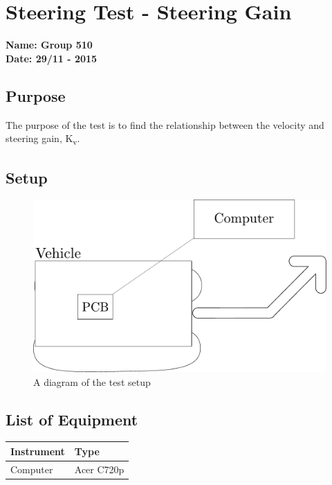 \pagebreak
\section{Steering Test - Steering Gain} \label{app:steeringOrderTest}
\textbf{Name: Group 510}\\
\textbf{Date: 29/11 - 2015}

\subsection{Purpose}
The purpose of the test is to find the relationship between the velocity and steering gain, \si{K_v}.


\subsection{Setup}
\begin{figure}[H]
  \centering
	\includegraphics[scale=0.7]{figures/inertiaTestSetupDiagramTurning.pdf}
	\caption{A diagram of the test setup}
\end{figure}

\subsection{List of Equipment}

\begin{table}[H]
\begin{tabular}{|p{10cm}|p{4cm}|}
\hline%
  \textbf{Instrument}                     &  \textbf{Type}       \\
\hline%
  Computer                                &  Acer C720p    \\
\hline %
\end{tabular}
\end{table}

